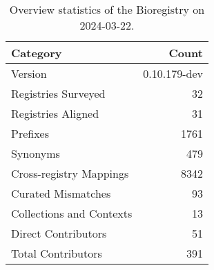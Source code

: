 \begin{table}
\caption{Overview statistics of the Bioregistry on 2024-03-22.}
\label{tab:bioregistry-summary}
\begin{tabular}{lr}
\toprule
Category & Count \\
\midrule
Version & 0.10.179-dev \\
Registries Surveyed & 32 \\
Registries Aligned & 31 \\
Prefixes & 1761 \\
Synonyms & 479 \\
Cross-registry Mappings & 8342 \\
Curated Mismatches & 93 \\
Collections and Contexts & 13 \\
Direct Contributors & 51 \\
Total Contributors & 391 \\
\bottomrule
\end{tabular}
\end{table}
